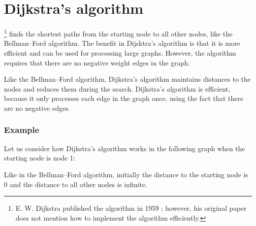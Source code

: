 \section{Dijkstra's algorithm}


\footnote{E. W. Dijkstra published the algorithm in 1959 \cite{dij59};
however, his original paper does not mention how to implement the algorithm efficiently.}
finds the shortest
paths from the starting node to all other nodes,
like the Bellman–Ford algorithm.
The benefit in Dijsktra's algorithm is that
it is more efficient and can be used for
processing large graphs.
However, the algorithm requires that there
are no negative weight edges in the graph.

Like the Bellman–Ford algorithm,
Dijkstra's algorithm maintains distances
to the nodes and reduces them during the search.
Dijkstra's algorithm is efficient, because
it only processes
each edge in the graph once, using the fact
that there are no negative edges.

\subsubsection{Example}

Let us consider how Dijkstra's algorithm
works in the following graph when the
starting node is node 1:
\begin{center}
\end{center}
Like in the Bellman–Ford algorithm,
initially the distance to the starting node is 0
and the distance to all other nodes is infinite.

